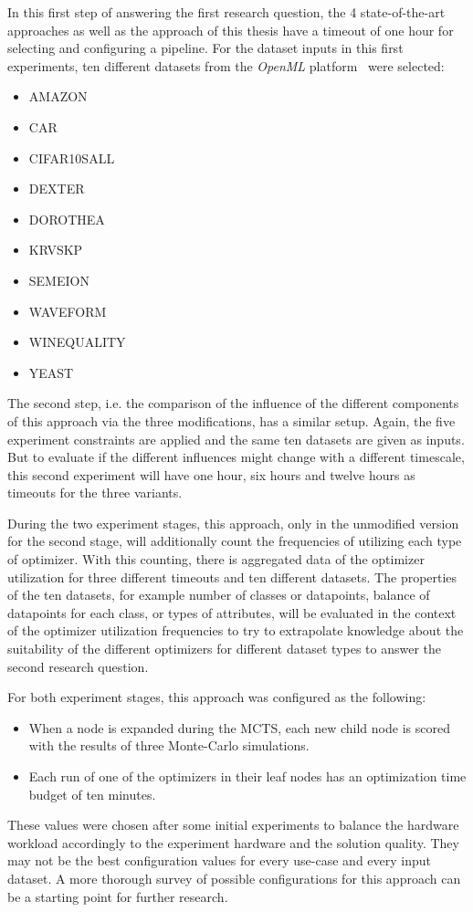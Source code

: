 In this first step of answering the first research question, the 4 state-of-the-art approaches as well as the approach of this thesis have a timeout of one hour for selecting and configuring a pipeline.
For the dataset inputs in this first experiments, ten different datasets from the \textit{OpenML} platform~\cite{Vanschoren-OpenML} were selected:
\begin{itemize}
    \item AMAZON
    \item CAR
    \item CIFAR10SALL
    \item DEXTER
    \item DOROTHEA
    \item KRVSKP
    \item SEMEION
    \item WAVEFORM
    \item WINEQUALITY
    \item YEAST
\end{itemize}

The second step, i.e. the comparison of the influence of the different components of this approach via the three modifications, has a similar setup.
Again, the five experiment constraints are applied and the same ten datasets are given as inputs.
But to evaluate if the different influences might change with a different timescale, this second experiment will have one hour, six hours and twelve hours as timeouts for the three variants.

During the two experiment stages, this approach, only in the unmodified version for the second stage, will additionally count the frequencies of utilizing each type of optimizer.
With this counting, there is aggregated data of the optimizer utilization for three different timeouts and ten different datasets.
The properties of the ten datasets, for example number of classes or datapoints, balance of datapoints for each class, or types of attributes, will be evaluated in the context of the optimizer utilization frequencies to try to extrapolate knowledge about the suitability of the different optimizers for different dataset types to answer the second research question.

For both experiment stages, this approach was configured as the following:
\begin{itemize}
    \item When a node is expanded during the MCTS, each new child node is scored with the results of three Monte-Carlo simulations.
    \item Each run of one of the optimizers in their leaf nodes has an optimization time budget of ten minutes.
\end{itemize}
These values were chosen after some initial experiments to balance the hardware workload accordingly to the experiment hardware and the solution quality.
They may not be the best configuration values for every use-case and every input dataset.
A more thorough survey of possible configurations for this approach can be a starting point for further research.

